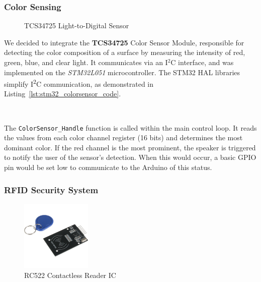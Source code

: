 \documentclass{article}
\begin{document}
\subsubsection{Color Sensing}
\label{sec:colorsensor}
\begin{figure}[H]
    \centering
    \setlength{\fboxsep}{0pt}%
    \caption{TCS34725 Light-to-Digital Sensor}
    \label{fig:colorsensor}
\end{figure}

We decided to integrate the \textbf{TCS34725} Color Sensor Module, responsible for detecting the color composition of a surface by measuring the intensity of red, green, blue, and clear light. It communicates via an I$^2$C interface, and was implemented on the \emph{STM32L051} microcontroller. The STM32 HAL libraries simplify I\textsuperscript{2}C communication, as demonstrated in Listing~\ref{lst:stm32_colorsensor_code}.

\

The \texttt{ColorSensor\_Handle} function is called within the main control loop. It reads the values from each color channel register (16 bits) and determines the most dominant color. If the red channel is the most prominent, the speaker is triggered to notify the user of the sensor's detection. When this would occur, a basic GPIO pin would be set low to communicate to the Arduino of this status.


\subsubsection{RFID Security System}
\label{sec:rfidsensor}
\begin{figure}[H]
    \centering
    \includegraphics[width=0.3\textwidth]{Figures/rfidsensor.png} %
    \caption{RC522 Contactless Reader IC}
    \label{fig:rfidsensor}


\end{figure}
\end{document}
